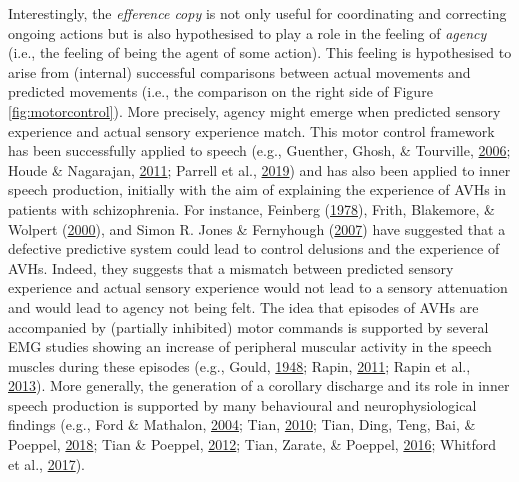 \documentclass[a4paper,12pt,twoside,onecolumn,openright,final,oldfontcommands]{memoir}
\begin{document}
Interestingly, the \emph{efference copy} is not only useful for coordinating and correcting ongoing actions but is also hypothesised to play a role in the feeling of \emph{agency} (i.e., the feeling of being the agent of some action). This feeling is hypothesised to arise from (internal) successful comparisons between actual movements and predicted movements (i.e., the comparison on the right side of Figure \ref{fig:motorcontrol}). More precisely, agency might emerge when predicted sensory experience and actual sensory experience match. This motor control framework has been successfully applied to speech (e.g., Guenther, Ghosh, \& Tourville, \protect\hyperlink{ref-guenther_neural_2006}{2006}; Houde \& Nagarajan, \protect\hyperlink{ref-houde_speech_2011}{2011}; Parrell et al., \protect\hyperlink{ref-parrell_current_2019}{2019}) and has also been applied to inner speech production, initially with the aim of explaining the experience of AVHs in patients with schizophrenia. For instance, Feinberg (\protect\hyperlink{ref-feinberg_efference_1978}{1978}), Frith, Blakemore, \& Wolpert (\protect\hyperlink{ref-frith_explaining_2000}{2000}), and Simon R. Jones \& Fernyhough (\protect\hyperlink{ref-jones_neural_2007}{2007}) have suggested that a defective predictive system could lead to control delusions and the experience of AVHs. Indeed, they suggests that a mismatch between predicted sensory experience and actual sensory experience would not lead to a sensory attenuation and would lead to agency not being felt. The idea that episodes of AVHs are accompanied by (partially inhibited) motor commands is supported by several EMG studies showing an increase of peripheral muscular activity in the speech muscles during these episodes (e.g., Gould, \protect\hyperlink{ref-gould_verbal_1948}{1948}; Rapin, \protect\hyperlink{ref-Rapin2011}{2011}; Rapin et al., \protect\hyperlink{ref-Rapin2013}{2013}). More generally, the generation of a corollary discharge and its role in inner speech production is supported by many behavioural and neurophysiological findings (e.g., Ford \& Mathalon, \protect\hyperlink{ref-ford_electrophysiological_2004}{2004}; Tian, \protect\hyperlink{ref-tian_mental_2010}{2010}; Tian, Ding, Teng, Bai, \& Poeppel, \protect\hyperlink{ref-tian_imagined_2018}{2018}; Tian \& Poeppel, \protect\hyperlink{ref-tian_mental_2012}{2012}; Tian, Zarate, \& Poeppel, \protect\hyperlink{ref-tian_mental_2016}{2016}; Whitford et al., \protect\hyperlink{ref-whitford_neurophysiological_2017}{2017}).

\vspace{2mm}
\end{document}
